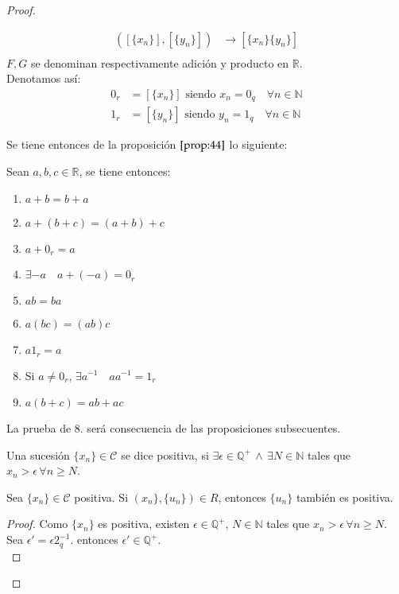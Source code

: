 \begin{proof}
\begin{definition}
\begin{align*}
    ([\{x_n\}],[\{y_n\}]) &\to [\{x_n\}\{y_n\}] \\
  \end{align*}
  $F, G$ se denominan respectivamente adición y producto en $\mathbb{R}$.\\
  Denotamos así:
  \begin{align*}
    0_r &= [\{x_n\}] \mbox{ siendo } x_n =0_q \quad \forall n \in
    \mathbb{N} \\
    1_r &= [\{y_n\}] \mbox{ siendo } y_n =1_q \quad \forall n \in
    \mathbb{N} 
  \end{align*}
\end{definition}
Se tiene entonces de la proposición $\eqref{prop:44}$ lo siguiente:
\begin{proposition}\label{prop:46}
  Sean $a,b,c \in \mathbb{R}$, se tiene entonces:
  \begin{enumerate}
    \item $a + b = b +a$
    \item $a +(b +c ) = (a+b)+c$
    \item $a + 0_r = a$
    \item $\exists -a \quad a + (-a) = 0_r$
    \item $a  b = b a$
    \item $a (b c ) = (ab)c$
    \item $a  1_r = a$
    \item Si $a\neq 0_r$, $\exists a^{-1} \quad a  a^{-1} = 1_r$
    \item $a(b + c) = ab + ac$
  \end{enumerate}
\end{proposition}
La prueba de $8.$ será consecuencia de las proposiciones subsecuentes.
\begin{definition}
  Una sucesión $\{x_n\} \in \mathcal{C}$ se dice positiva, si $\exists
  \epsilon \in \mathbb{Q}^+ \, \land \, \exists N \in \mathbb{N}$ tales que
  $x_n > \epsilon \, \forall n \geq N$.
\end{definition}
\begin{proposition}\label{prop:47}
Sea $\{x_n\} \in \mathcal{C}$ positiva. Si $(x_n\}, \{u_n\})\in R$, entonces
$\{u_n\}$ también es positiva.
\end{proposition}
\begin{proof}
  Como $\{x_n\}$ es positiva, existen $\epsilon \in \mathbb{Q}^+$, $N \in
  \mathbb{N}$ tales que $x_n > \epsilon \, \forall n \geq N$.\\
  Sea $\epsilon' = \epsilon 2_q^{-1}$. entonces $\epsilon' \in
  \mathbb{Q}^+$.\\

\end{proof}
\end{proof}
